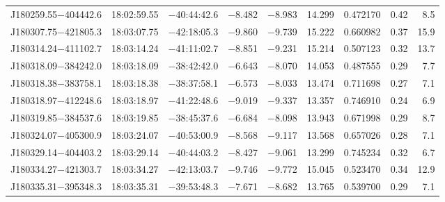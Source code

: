 \begin{table*}[ht!]
\begin{tabular}{lcccccccr}
J180259.55$-$404442.6 & 18:02:59.55 & $-$40:44:42.6 & $-$8.482 & $-$8.983 & 14.299 & 0.472170 & 0.42 &  8.5 \\
J180307.75$-$421805.3 & 18:03:07.75 & $-$42:18:05.3 & $-$9.860 & $-$9.739 & 15.222 & 0.660982 & 0.37 & 15.9 \\
J180314.24$-$411102.7 & 18:03:14.24 & $-$41:11:02.7 & $-$8.851 & $-$9.231 & 15.214 & 0.507123 & 0.32 & 13.7 \\
J180318.09$-$384242.0 & 18:03:18.09 & $-$38:42:42.0 & $-$6.643 & $-$8.070 & 14.053 & 0.487555 & 0.29 &  7.7 \\
J180318.38$-$383758.1 & 18:03:18.38 & $-$38:37:58.1 & $-$6.573 & $-$8.033 & 13.474 & 0.711698 & 0.27 &  7.1 \\
J180318.97$-$412248.6 & 18:03:18.97 & $-$41:22:48.6 & $-$9.019 & $-$9.337 & 13.357 & 0.746910 & 0.24 &  6.9 \\
J180319.85$-$384537.6 & 18:03:19.85 & $-$38:45:37.6 & $-$6.684 & $-$8.098 & 13.943 & 0.671998 & 0.29 &  8.7 \\
J180324.07$-$405300.9 & 18:03:24.07 & $-$40:53:00.9 & $-$8.568 & $-$9.117 & 13.568 & 0.657026 & 0.28 &  7.1 \\
J180329.14$-$404403.2 & 18:03:29.14 & $-$40:44:03.2 & $-$8.427 & $-$9.061 & 13.299 & 0.745234 & 0.32 &  6.7 \\
J180334.27$-$421303.7 & 18:03:34.27 & $-$42:13:03.7 & $-$9.746 & $-$9.772 & 15.045 & 0.523470 & 0.34 & 12.9 \\
J180335.31$-$395348.3 & 18:03:35.31 & $-$39:53:48.3 & $-$7.671 & $-$8.682 & 13.765 & 0.539700 & 0.29 &  7.1 \\
\hline
\end{tabular}
\end{table*}

\addtocounter{table}{-1}

